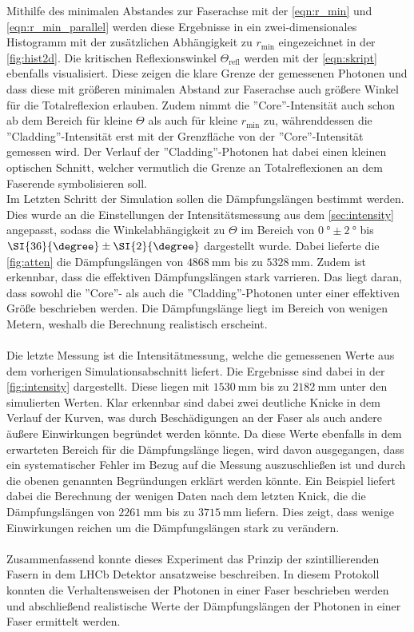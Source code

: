 Mithilfe des minimalen Abstandes zur Faserachse mit der \autoref{eqn:r_min} und \autoref{eqn:r_min_parallel} werden diese Ergebnisse in ein zwei-dimensionales Histogramm mit der zusätzlichen Abhängigkeit zu $r_{\text{min}}$ eingezeichnet in der \autoref{fig:hist2d}. Die kritischen Reflexionswinkel $\Theta_{\text{refl}}$ werden mit der \autoref{eqn:skript} ebenfalls visualisiert. Diese zeigen die klare Grenze der gemessenen Photonen und dass diese mit größeren minimalen Abstand zur Faserachse auch größere Winkel für die Totalreflexion erlauben. Zudem nimmt die ''Core''-Intensität auch schon ab dem Bereich für kleine $\Theta$ als auch für kleine $r_{\text{min}}$ zu, währenddessen die ''Cladding''-Intensität erst mit der Grenzfläche von der ''Core''-Intensität gemessen wird. Der Verlauf der ''Cladding''-Photonen hat dabei einen kleinen optischen Schnitt, welcher vermutlich die Grenze an Totalreflexionen an dem Faserende symbolisieren soll.\\
Im Letzten Schritt der Simulation sollen die Dämpfungslängen bestimmt werden. Dies wurde an die Einstellungen der Intensitätsmessung aus dem \autoref{sec:intensity} angepasst, sodass die Winkelabhängigkeit zu $\Theta$ im Bereich von $\SI{0}{\degree} \pm \SI{2}{\degree}$ bis $\SI{36}{{\degree}} \pm \SI{2}{\degree}$ dargestellt wurde. Dabei lieferte die \autoref{fig:atten} die Dämpfungslängen von $\SI{4868}{\milli\meter}$ bis zu $\SI{5328}{\milli\meter}$. Zudem ist erkennbar, dass die effektiven Dämpfungslängen stark varrieren. Das liegt daran, dass sowohl die ''Core''- als auch die ''Cladding''-Photonen unter einer effektiven Größe beschrieben werden. Die Dämpfungslänge liegt im Bereich von wenigen Metern, weshalb die Berechnung realistisch erscheint.\\\\
Die letzte Messung ist die Intensitätmessung, welche die gemessenen Werte aus dem vorherigen Simulationsabschnitt liefert. Die Ergebnisse sind dabei in der \autoref{fig:intensity} dargestellt. Diese liegen mit $\SI{1530}{\milli\meter}$ bis zu $\SI{2182}{\milli\meter}$ unter den simulierten Werten. Klar erkennbar sind dabei zwei deutliche Knicke in dem Verlauf der Kurven, was durch Beschädigungen an der Faser als auch andere äußere Einwirkungen begründet werden könnte. Da diese Werte ebenfalls in dem erwarteten Bereich für die Dämpfungslänge liegen, wird davon ausgegangen, dass ein systematischer Fehler im Bezug auf die Messung auszuschließen ist und durch die obenen genannten Begründungen erklärt werden könnte. Ein Beispiel liefert dabei die Berechnung der wenigen Daten nach dem letzten Knick, die die Dämpfungslängen von $\SI{2261}{\milli\meter}$ bis zu $\SI{3715}{\milli\meter}$ liefern. Dies zeigt, dass wenige Einwirkungen reichen um die Dämpfungslängen stark zu verändern.\\\\
Zusammenfassend konnte dieses Experiment das Prinzip der szintillierenden Fasern in dem LHCb Detektor ansatzweise beschreiben. In diesem Protokoll konnten die Verhaltensweisen der Photonen in einer Faser beschrieben werden und abschließend realistische Werte der Dämpfungslängen der Photonen in einer Faser ermittelt werden.